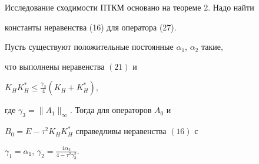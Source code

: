  


Исследование сходимости ПТКМ основано на теореме 2. Надо найти 


константы неравенства (16) для оператора (27). 


 


\begin{lem} 


Пусть существуют положительные постоянные $\alpha_1$, $\alpha_2$ такие, 


что выполнены неравенства $(21)$ и 


$K_H K^*_H\le\frac{\gamma_3}{4}(K_H+K^*_H)$, 


где $\gamma_3=\|A_1\|_\infty$. Тогда для операторов $A_0$ и 


$B_0=E-\tau^2K_H{}K^*_H$ справедливы неравенства $(16)$ с 


$\gamma_1=\alpha_1$, $\gamma_2=\frac{4\alpha_2}{4-\tau^2\gamma^2_3}$. 


\end{lem} 


 


